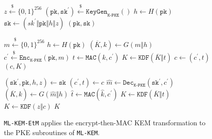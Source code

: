 \documentclass[runningheads]{llncs}
\newcommand{\keygen}{\texttt{KeyGen}}
\newcommand{\encrypt}{\texttt{Enc}}
\newcommand{\decrypt}{\texttt{Dec}}
\newcommand{\encap}{\texttt{Encap}}
\newcommand{\decap}{\texttt{Decap}}
\newcommand{\mac}{\texttt{MAC}}
\newcommand{\pk}{\texttt{pk}}
\newcommand{\sk}{\texttt{sk}}
\newcommand{\leftsample}{\stackrel{\$}{\leftarrow}}
\begin{document}
\begin{figure}[h]
    \centering

    \begin{minipage}[t]{0.34\textwidth}
        \begin{algorithm}[H]
            \caption*{$\keygen_\texttt{ML-KEM-EtM}()$}
            \begin{algorithmic}[1]
                \State $z \leftsample \{0,1\}^{256}$
                \State $(\pk, \sk^\prime) \leftsample \keygen_\texttt{K-PKE}()$
                \State $h \leftarrow H(\pk)$
                \State $\sk \leftarrow (sk^\prime \Vert \pk \Vert h \Vert z)$
                \State \Return $(\pk, \sk)$
            \end{algorithmic}
        \end{algorithm}
    \end{minipage}
    \begin{minipage}[t]{0.3\textwidth}
        \begin{algorithm}[H]
            \caption*{$\encap_\texttt{ML-KEM-EtM}(\pk)$}
            \begin{algorithmic}[1]
                \State $m \leftsample \{0,1\}^{256}$
                \State $h \leftarrow H(\pk)$
                \State $(\overline{K}, k) \leftarrow G(m \Vert h)$
                \State $c^\prime \leftsample \encrypt_\texttt{K-PKE}(\pk, m)$
                \State $t \leftarrow \mac(k, c^\prime)$
                \State $K \leftarrow \texttt{KDF}(\overline{K} \Vert t)$
                \State $c \leftarrow (c^\prime, t)$
                \State \Return $(c, K)$
            \end{algorithmic}
        \end{algorithm}
    \end{minipage}
    \begin{minipage}[t]{0.34\textwidth}
        \begin{algorithm}[H]
            \caption*{$\decap_\texttt{ML-KEM-EtM}(\sk, c)$}
            \begin{algorithmic}[1]
                \State $(\sk^\prime, \pk, h, z) \leftarrow \sk$
                \State $(c^\prime, t) \leftarrow c$
                \State $\hat{m} \leftarrow \decrypt_\texttt{K-PKE}(\sk^\prime, c^\prime)$
                \State $(\overline{K}, \hat{k}) \leftarrow G(\hat{m} \Vert h)$
                \State $\hat{t} \leftarrow \mac(\hat{k}, c^\prime)$
                    \State $K \leftarrow \texttt{KDF}(\overline{K} \Vert t)$
                \Else
                    \State $K \leftarrow \texttt{KDF}(z \Vert c)$
                \EndIf
                \State \Return $K$
            \end{algorithmic}
        \end{algorithm}
    \end{minipage}

    \caption{\texttt{ML-KEM-EtM} applies the encrypt-then-MAC KEM transformation to the PKE subroutines of \texttt{ML-KEM}.}\label{fig:ml-kem-plus-routines}
\end{figure}
\end{document}
